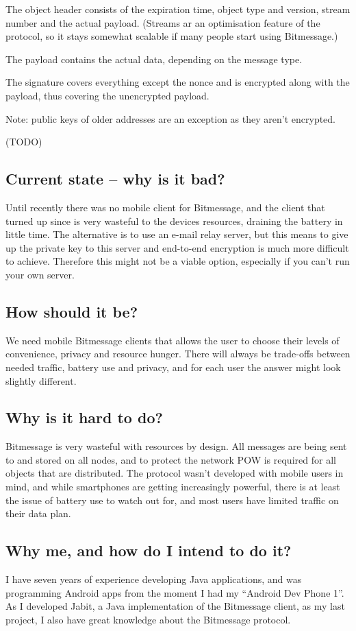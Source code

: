 \documentclass{bfh}
\begin{document}
  The object header consists of the expiration time, object type and version, stream number and the actual payload. (Streams ar an optimisation feature of the protocol, so it stays somewhat scalable if many people start using Bitmessage.)
  
  The payload contains the actual data, depending on the message type.
  
  The signature covers everything except the nonce and is encrypted along with the payload, thus covering the unencrypted payload.
  
  Note: public keys of older addresses are an exception as they aren't encrypted.

(TODO)\newpage

  \subsection{Current state -- why is it bad?}
  Until recently there was no mobile client for Bitmessage, and the client that turned up since is very wasteful to the devices resources, draining the battery in little time. The alternative is to use an e-mail relay server, but this means to give up the private key to this server and end-to-end encryption is much more difficult to achieve. Therefore this might not be a viable option, especially if you can't run your own server.

  \subsection{How should it be?}
  We need mobile Bitmessage clients that allows the user to choose their levels of convenience, privacy and resource hunger. There will always be trade-offs between needed traffic, battery use and privacy, and for each user the answer might look slightly different.

  \subsection{Why is it hard to do?}
  Bitmessage is very wasteful with resources by design. All messages are being sent to and stored on all nodes, and to protect the network \ac{POW} is required for all objects that are distributed. The protocol wasn't developed with mobile users in mind, and while smartphones are getting increasingly powerful, there is at least the issue of battery use to watch out for, and most users have limited traffic on their data plan.

  \subsection{Why me, and how do I intend to do it?}
  I have seven years of experience developing Java applications, and was programming Android apps from the moment I had my ``Android Dev Phone 1''. As I developed Jabit, a Java implementation of the Bitmessage client, as my last project, I also have great knowledge about the Bitmessage protocol.
\end{document}
